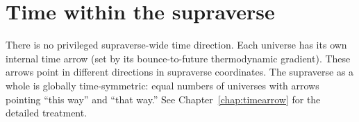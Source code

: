 \section{Time within the supraverse}

There is no privileged supraverse-wide time direction. Each universe has its own
internal time arrow (set by its bounce-to-future thermodynamic gradient). These
arrows point in different directions in supraverse coordinates. The supraverse as
a whole is globally time-symmetric: equal numbers of universes with arrows
pointing ``this way'' and ``that way.'' See Chapter~\ref{chap:timearrow} for the
detailed treatment.
